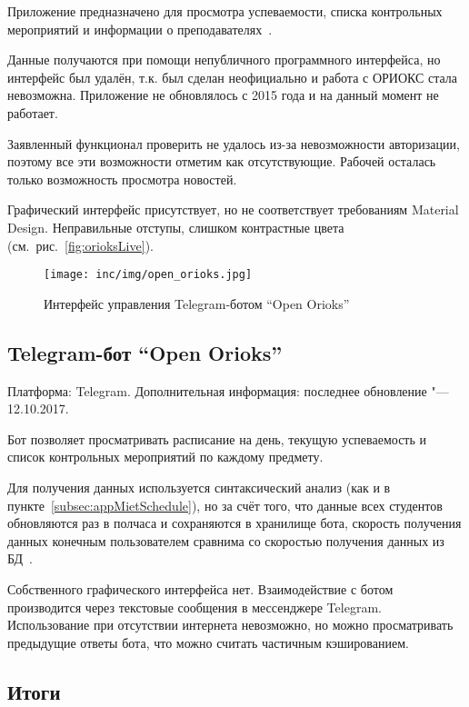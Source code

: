 Приложение предназначено для просмотра успеваемости, списка контрольных мероприятий и информации о преподавателях~\cite{market:orioksLive}.

Данные получаются при помощи непубличного программного интерфейса, но интерфейс был удалён, т.к. был сделан неофициально и работа с ОРИОКС стала невозможна.
Приложение не обновлялось с 2015 года и на данный момент не работает.

Заявленный функционал проверить не удалось из-за невозможности авторизации, поэтому все эти возможности отметим как отсутствующие.
Рабочей осталась только возможность просмотра новостей.

Графический интерфейс присутствует, но не соответствует требованиям Material Design.
Неправильные отступы, слишком контрастные цвета (см.~рис.~\ref{fig:orioksLive}).

\begin{figure}[ht]
  \centering
  \texttt{[image: inc/img/open\_orioks.jpg]}
  \caption{Интерфейс управления Telegram-ботом ``Open Orioks''}
  \label{fig:openOrioks}
\end{figure}

\subsection{Telegram-бот ``Open Orioks''}
\label{subsec:botOpenOrioks}
Платформа: Telegram.
Дополнительная информация: последнее обновление "--- 12.10.2017.

Бот позволяет просматривать расписание на день, текущую успеваемость и список контрольных мероприятий по каждому предмету.

Для получения данных используется синтаксический анализ (как и в пункте~\ref{subsec:appMietSchedule}), но за счёт того, что данные всех студентов обновляются раз в полчаса и сохраняются в хранилище бота, скорость получения данных конечным пользователем сравнима со скоростью получения данных из БД~\cite{github:openOrioks}.

Собственного графического интерфейса нет.
Взаимодействие с ботом производится через текстовые сообщения в мессенджере Telegram.
Использование при отсутствии интернета невозможно, но можно просматривать предыдущие ответы бота, что можно считать частичным кэшированием.

\subsection{Итоги}
\label{subsec:analogsSummary}

